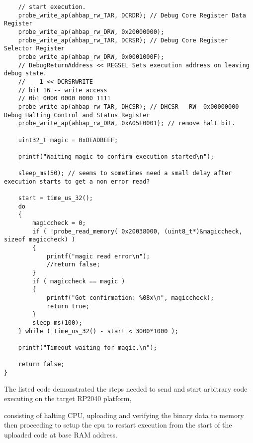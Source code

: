 \begin{code}
\begin{verbatim}
	// start execution.
	probe_write_ap(ahbap_rw_TAR, DCRDR); // Debug Core Register Data Register
	probe_write_ap(ahbap_rw_DRW, 0x20000000);
	probe_write_ap(ahbap_rw_TAR, DCRSR); // Debug Core Register Selector Register
	probe_write_ap(ahbap_rw_DRW, 0x0001000F);
	// DebugReturnAddress << REGSEL Sets execution address on leaving debug state.
	//    1 << DCRSRWRITE
	// bit 16 -- write access
	// 0b1 0000 0000 0000 1111
	probe_write_ap(ahbap_rw_TAR, DHCSR); // DHCSR	RW	0x00000000	Debug Halting Control and Status Register
	probe_write_ap(ahbap_rw_DRW, 0xA05F0001); // remove halt bit.
	
	uint32_t magic = 0xDEADBEEF;
	
	printf("Waiting magic to confirm execution started\n");
	
	sleep_ms(50); // seems to sometimes need a small delay after execution starts to get a non error read?
	
	start = time_us_32();
	do
	{
		magiccheck = 0;
		if ( !probe_read_memory( 0x20038000, (uint8_t*)&magiccheck, sizeof magiccheck) )
		{
			printf("magic read error\n");
			//return false;
		}
		if ( magiccheck == magic )
		{
			printf("Got confirmation: %08x\n", magiccheck);
			return true;
		}
		sleep_ms(100);
	} while ( time_us_32() - start < 3000*1000 );
	
	printf("Timeout waiting for magic.\n");
	
	return false;
}
	\end{verbatim}
	\label{code:probe_sendhelper}
\end{code}

The listed code demonstrated the steps needed to send and start arbitrary code executing on the target RP2040 platform,

consisting of halting CPU, uploading and verifying the binary data to memory then proceeding to setup the cpu to restart execution from the start of the uploaded code at base RAM address.


